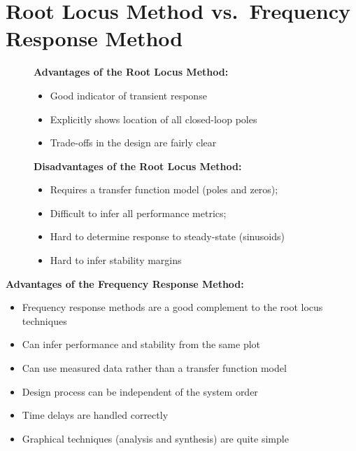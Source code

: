 \documentclass[
  14pt,
  a4paper,
  oneside,
  open=any,
  a4paper,
  14pt]{report}
\providecommand{\tightlist}{%
  \setlength{\itemsep}{0pt}\setlength{\parskip}{0pt}}\usepackage{longtable,booktabs,array}
\begin{document}
\section{Root Locus Method vs.~Frequency Response
Method}\label{root-locus-method-vs.-frequency-response-method}

\begin{figure}

\begin{minipage}{0.50\linewidth}
\textbf{Advantages of the Root Locus Method:}

\begin{itemize}
\tightlist
\item
  Good indicator of transient response
\item
  Explicitly shows location of all closed-loop poles
\item
  Trade-offs in the design are fairly clear
\end{itemize}

\end{minipage}%
%
\begin{minipage}{0.50\linewidth}
\textbf{Disadvantages of the Root Locus Method:}

\begin{itemize}
\tightlist
\item
  Requires a transfer function model (poles and zeros);
\item
  Difficult to infer all performance metrics;
\item
  Hard to determine response to steady-state (sinusoids)
\item
  Hard to infer stability margins
\end{itemize}

\end{minipage}%

\end{figure}%

\textbf{Advantages of the Frequency Response Method:}

\begin{itemize}
\tightlist
\item
  Frequency response methods are a good complement to the root locus
  techniques
\item
  Can infer performance and stability from the same plot
\item
  Can use measured data rather than a transfer function model
\item
  Design process can be independent of the system order
\item
  Time delays are handled correctly
\item
  Graphical techniques (analysis and synthesis) are quite simple
\end{itemize}
\end{document}
